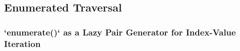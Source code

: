 \subsection{Enumerated Traversal}
\subsubsection{`enumerate()` as a Lazy Pair Generator for Index-Value Iteration}
